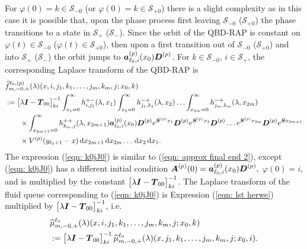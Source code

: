 For \(\varphi(0)=k\in\mathcal S_{-0}\) (or \(\varphi(0)=k\in\mathcal S_{+0}\)) there is a slight complexity as in this case it is possible that, upon the phase process first leaving \(\mathcal S_{-0}\) (\(\mathcal S_{+0}\)) the phase transitions to a state in \(\mathcal S_+\) (\(\mathcal S_-\)). Since the orbit of the QBD-RAP is constant on \(\varphi(t)\in\mathcal S_{-0}\) (\(\varphi(t)\in\mathcal S_{+0}\)), then upon a first transition out of \(\mathcal S_{-0}\) (\(\mathcal S_{+0}\)) and into \(\mathcal S_+\) (\(\mathcal S_-\)) the orbit jumps to \(\boldsymbol   a_{\ell_0,i}^{(p)}(x_0)\boldsymbol D^{(p)}\). For \(k\in\mathcal S_{-0}\), \(i\in\mathcal S_+\), the corresponding Laplace transform of the QBD-RAP is
\begin{align}
	&\widehat{f}_{m,-0,+}^{\ell_0,(p)}(\lambda)(x,i,j_1,k_1,\dots,j_m,k_m,j;x_0,k)\nonumber 
	\\&:=\begin{bmatrix} \lambda \boldsymbol I - \boldsymbol T_{00} \end{bmatrix}^{-1}_{ki}\int_{x_1=0}^\infty h^{+-}_{i,j_{1}}(\lambda,x_1)\nonumber
	\int_{x_2=0}^\infty h^{-+}_{j_1,k_1}(\lambda,x_2)
	\hdots \int_{x_{2m}=0}^\infty h^{-+}_{j_{m},k_m}(\lambda, x_{2m})  
	\\&\qquad \times\int_{x_{2m+1}=0}^\infty h^{++}_{k_m,j}(\lambda,x_{2m+1})
	 \boldsymbol   a_{\ell_0,i}^{(p)}(x_0)\boldsymbol D^{(p)}e^{\boldsymbol{S}^{(p)}x_1} \boldsymbol{D}^{(p)} e^{\boldsymbol{S}^{(p)}x_2} \boldsymbol{D}^{(p)}\dots e^{\boldsymbol{S}^{(p)}x_{2m}}  \boldsymbol{D}^{(p)}e^{\boldsymbol{S}x_{2m+1}} \nonumber 
	 \\&\qquad{}\times V^{(p)}(y_{\ell_0+1}-x)  \, \mathrm{d} x_{2m+1} \, \mathrm{d} x_{2m}\dots\, \mathrm{d} x_2 \, \mathrm{d} x_1.\label{eqn: k0jJ0}
\end{align}
The expression (\ref{eqn: k0jJ0}) is similar to (\ref{eqn: approx final end 2}), except (\ref{eqn: k0jJ0}) has a different initial condition \(\boldsymbol A^{(p)}(0) = \boldsymbol   a_{\ell_0,i}^{(p)}(x_0)\boldsymbol D^{(p)},\) \(\varphi(0)=i\), and is multiplied by the constant \(\begin{bmatrix} \lambda \boldsymbol I - \boldsymbol T_{00} \end{bmatrix}^{-1}_{ki}\). 
The Laplace transform of the fluid queue corresponding to (\ref{eqn: k0jJ0}) is Expression (\ref{eqn: lst herwe}) multiplied by \(\begin{bmatrix} \lambda \boldsymbol I - \boldsymbol T_{00} \end{bmatrix}^{-1}_{ki}\), i.e.
\begin{align}
	&\widehat \mu_{m,-0,+}^{\ell_0}(\lambda)(x,i,j_1,k_1,\dots,j_m,k_m,j;x_0,k) \nonumber 
	\\&:= \begin{bmatrix} \lambda \boldsymbol I - \boldsymbol T_{00} \end{bmatrix}^{-1}_{ki}\widehat \mu_{m,-0,+}^{\ell_0}(\lambda)(x,j_1,k_1,\dots,j_m,k_m,j;x_0,i).
\end{align}

